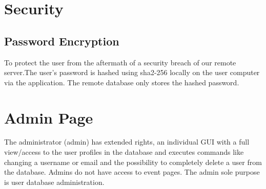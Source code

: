 \section{Security}
\subsection{Password Encryption}
To protect the user from the aftermath of a security breach of our remote server.The user's password is hashed using
sha2-256 locally on the user computer via the application. The remote database only stores the hashed password.




\section{Admin Page}
The administrator (admin) has extended rights, an individual GUI with a full view/access to the user profiles in the database and executes commands like changing a username or email and the possibility to completely delete a user from the database.  
Admins do not have access to event pages. The admin sole purpose is user database administration.
